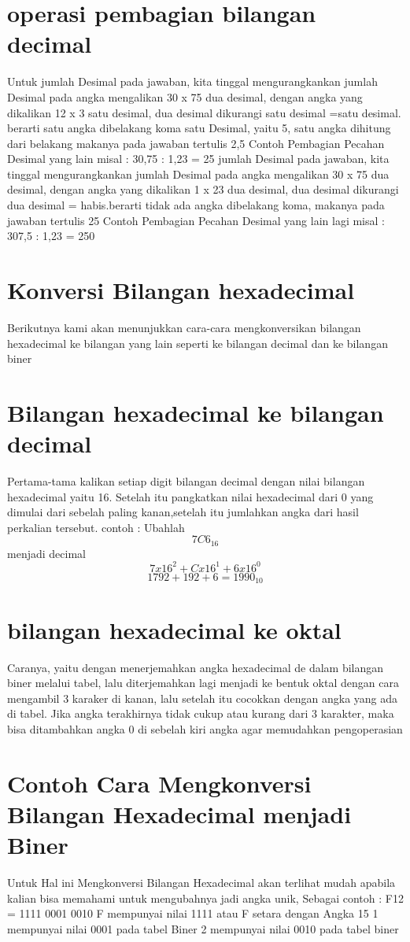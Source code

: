 \section{operasi pembagian bilangan decimal}
Untuk jumlah Desimal pada jawaban, kita tinggal mengurangkankan jumlah Desimal pada angka mengalikan 30 x 75 dua desimal, 
dengan angka yang dikalikan 12 x 3 satu desimal, 
dua desimal dikurangi satu desimal =satu desimal. berarti satu angka dibelakang koma satu Desimal, yaitu 5, satu angka dihitung dari belakang makanya pada jawaban tertulis 2,5
 Contoh Pembagian Pecahan Desimal yang lain misal : 
 30,75 : 1,23 = 25
jumlah Desimal pada jawaban, kita tinggal mengurangkankan jumlah Desimal pada angka mengalikan 30 x 75 dua desimal, 
dengan angka yang dikalikan 1 x 23 dua desimal, 
dua desimal dikurangi dua desimal = habis.berarti tidak ada angka dibelakang koma, makanya pada jawaban tertulis 25
 Contoh Pembagian Pecahan Desimal yang lain lagi misal : 
 307,5 : 1,23 = 250
\section{Konversi Bilangan hexadecimal}
Berikutnya kami akan menunjukkan cara-cara mengkonversikan bilangan hexadecimal ke bilangan yang lain seperti ke bilangan decimal dan ke bilangan biner
\section{Bilangan hexadecimal ke bilangan decimal}
Pertama-tama kalikan setiap digit bilangan decimal dengan nilai bilangan hexadecimal yaitu 16. Setelah itu pangkatkan nilai hexadecimal dari 0 yang dimulai dari sebelah paling kanan,setelah itu jumlahkan angka dari hasil perkalian tersebut.
contoh : 
Ubahlah \[ 7C6_16 \] menjadi decimal
		\[ 7 x 16^2 + C x 16^1 + 6 x 16^0\]
		\[ 1792 + 192 + 6 = 1990_10 \]

\section{bilangan hexadecimal ke oktal}
Caranya, yaitu dengan menerjemahkan angka hexadecimal de dalam bilangan biner melalui tabel, lalu diterjemahkan lagi menjadi ke bentuk oktal dengan cara mengambil 3 karaker di kanan, lalu setelah itu cocokkan dengan angka yang ada di tabel. Jika angka terakhirnya tidak cukup atau kurang dari 3 karakter, maka bisa ditambahkan angka 0 di sebelah kiri angka agar memudahkan pengoperasian

\section{Contoh Cara Mengkonversi Bilangan Hexadecimal menjadi Biner}
 Untuk Hal ini Mengkonversi Bilangan Hexadecimal akan terlihat mudah apabila kalian bisa memahami untuk mengubahnya jadi angka unik, Sebagai contoh :
 F12 = 1111 0001 0010
 F mempunyai nilai 1111 atau F setara dengan Angka 15
 1 mempunyai nilai 0001 pada tabel Biner
 2 mempunyai nilai 0010 pada tabel biner
 
